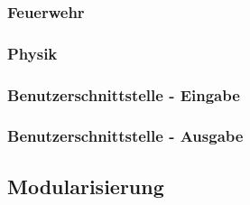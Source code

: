 \subsubsection{Feuerwehr}

\subsubsection{Physik}

\subsubsection{Benutzerschnittstelle - Eingabe}

\subsubsection{Benutzerschnittstelle - Ausgabe}

\subsection{Modularisierung}

